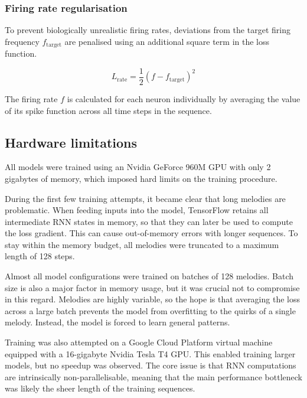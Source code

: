 \documentclass[../../report.tex]{subfiles}
\begin{document}
\subsubsection{Firing rate regularisation}

To prevent biologically unrealistic firing rates, deviations from the target
firing frequency \(f_\mathrm{target}\) are penalised using an additional square
term in the loss function.

\begin{equation*}
  L_\mathrm{rate} = \frac{1}{2} (f - f_\mathrm{target})^2
\end{equation*}

The firing rate \(f\) is calculated for each neuron individually by averaging
the value of its spike function across all time steps in the sequence.

\subsection{Hardware limitations}

All models were trained using an Nvidia GeForce 960M GPU with only 2 gigabytes
of memory, which imposed hard limits on the training procedure.

During the first few training attempts, it became clear that long melodies are
problematic. When feeding inputs into the model, TensorFlow retains all
intermediate RNN states in memory, so that they can later be used to compute the
loss gradient. This can cause out-of-memory errors with longer sequences. To
stay within the memory budget, all melodies were truncated to a maximum length
of 128 steps.

Almost all model configurations were trained on batches of 128 melodies. Batch
size is also a major factor in memory usage, but it was crucial not to
compromise in this regard. Melodies are highly variable, so the hope is that
averaging the loss across a large batch prevents the model from overfitting to
the quirks of a single melody. Instead, the model is forced to learn general
patterns.

Training was also attempted on a Google Cloud Platform virtual machine equipped
with a 16-gigabyte Nvidia Tesla T4 GPU. This enabled training larger models, but
no speedup was observed. The core issue is that RNN computations are
intrinsically non-parallelisable, meaning that the main performance bottleneck
was likely the sheer length of the training sequences.
\end{document}
